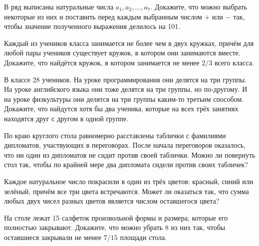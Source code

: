 \begin{problems}
\item В ряд выписаны натуральные числа $a_1,a_2,\ldots,a_7$. Докажите, что можно выбрать некоторые из них и поставить перед каждым выбранным числом $+$ или $-$ так, чтобы значение полученного выражения делилось на 101.

\item Каждый из учеников класса занимается не более чем в двух кружках, причём для любой пары учеников существует кружок, в котором они занимаются вместе. Докажите, что найдётся кружок, в котором занимается не менее $2/3$ всего класса.

\item В классе 28 учеников. На уроке программирования они делятся на три группы. На уроке английского языка они тоже делятся на три группы, но по-другому. И на уроке физкультуры они делятся на три группы каким-то третьим способом. Докажите, что найдутся хотя бы два ученика, которые на всех трёх занятиях находятся друг с другом в одной группе.

\item По краю круглого стола равномерно расставлены таблички с фамилиями дипломатов, участвующих в переговорах. После начала переговоров оказалось, что ни один из дипломатов не сидит против своей таблички. Можно ли повернуть стол так, чтобы по крайней мере два дипломата сидели против своих табличек?

\item Каждое натуральное число покрасили в один из трёх цветов: красный, синий или зелёный, причём все три цвета встречаются. Может ли оказаться так, что сумма любых двух чисел разных цветов является числом оставшегося цвета?

\item На столе лежат 15 салфеток произвольной формы и размера, которые его полностью закрывают. Докажите, что можно убрать 8 из них так, чтобы оставшиеся закрывали не менее $7/15$ площади стола.

\end{problems}


